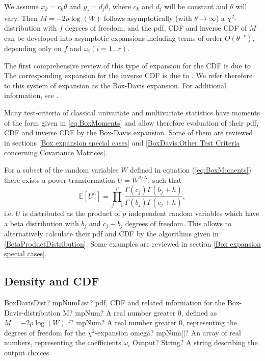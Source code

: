 \vpara
We assume $x_k=c_k \theta$ and $y_j=d_j \theta$, where $c_k$ and $d_j$ will be constant and $\theta$ will vary. Then $M=-2 \rho \log(W)$ follows asymptotically (with $\theta \rightarrow \infty$) a $\chi^2$-distribution with $f$ degrees of freedom, and the pdf, CDF and inverse CDF of $M$ can be developed into asymptotic expansions including terms of order $O(\theta^{-r})$, depending only on $f$ and $\omega_i (i=1 \ldots r)$.

\vpara
The first comprehensive review of this type of expansion for the CDF is due to \cite{Box_1949}. The corresponding expansion for the inverse CDF is due to \cite{Davis_1971}. We refer therefore to this system of expansion as the Box-Davis expansion. For additional information, see \cite{Anderson_book_2003}.

\vpara
Many test-criteria of classical univariate and multivariate statistics have moments of the form given in \ref{eq:BoxMoments} and allow therefore evaluation of their pdf, CDF and inverse CDF by the Box-Davis expansion. Some of them are reviewed in  sections  \ref{Box expansion special cases} and \ref{BoxDavis:Other Test Criteria concerning Covariance Matrices}. 

\vpara
For a subset of the random variables $W$ defined in equation (\ref{eq:BoxMoments}) there exists a power transformation $U=W^{2/N}$, such that
\begin{equation}
	\mathbb{E}[U^h]  = \prod_{j=1}^p \frac{\Gamma(c_j)\Gamma(b_j +h)}{\Gamma(b_j)\Gamma(c_j+h)},
\end{equation}
i.e. $U$ is distributed as the product of $p$ independent random variables which have a beta distribution with $b_j$ and $c_j-b_j$ degrees of freedom. This allows to alternatively calculate their pdf and CDF by the algorithms given in \ref{BetaProductDistribution}. Some examples are reviewed in  section \ref{Box expansion special cases}. 


\subsection{Density and CDF}

\begin{mpFunctionsExtract}
	\mpFunctionFourNotImplemented
	{BoxDavisDist? mpNumList? pdf, CDF and related information for the Box-Davis-distribution}
	{M? mpNum? A real number greater 0, defined as $M=-2 \rho \log(W)$}
	{f? mpNum? A real number greater 0, representing the degrees of freedom for the $\chi^2$-expansion}
	{omega? mpNum[]? An array of real numbers, representing the coefficients $\omega_i$}
	{Output? String? A string describing the output choices}
\end{mpFunctionsExtract}


